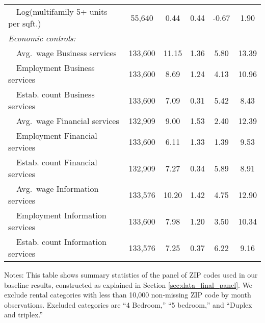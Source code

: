 \begin{table}[hbt!]
\begin{tabular}{@{}lccccc@{}}
        $\quad$Log(multifamily 5+ units per sqft.)    & 55,640  & 0.44  & 0.44  & -0.67  & 1.90  \\[.3em]
        \textit{Economic controls:}                   &       &       &       &       &       \\
        $\quad$Avg.\ wage Business services           & 133,600  & 11.15  & 1.36  & 5.80  & 13.39  \\
        $\quad$Employment Business services           & 133,600  & 8.69  & 1.24  & 4.13  & 10.96  \\
        $\quad$Estab. count Business services         & 133,600  & 7.09  & 0.31  & 5.42  & 8.43  \\
        $\quad$Avg.\ wage Financial services          & 132,909  & 9.00  & 1.53  & 2.40  & 12.39  \\
        $\quad$Employment Financial services          & 133,600  & 6.11  & 1.33  & 1.39  & 9.53  \\
        $\quad$Estab. count Financial services        & 132,909  & 7.27  & 0.34  & 5.89  & 8.91  \\
        $\quad$Avg.\ wage Information services        & 133,576  & 10.20  & 1.42  & 4.75  & 12.90  \\
        $\quad$Employment Information services        & 133,600  & 7.98  & 1.20  & 3.50  & 10.34  \\
        $\quad$Estab. count Information services      & 133,576  & 7.25  & 0.37  & 6.22  & 9.16  \\ \bottomrule
    \end{tabular}

    \begin{minipage}{.95\textwidth} \footnotesize
        \vspace{2mm}
        Notes: This table shows summary statistics of the panel of ZIP codes 
        used in our baseline results, constructed as explained in Section 
        \ref{sec:data_final_panel}.
        We exclude rental categories with less than 10,000 non-missing ZIP code 
        by month observations.
        Excluded categories are ``4 Bedroom,'' ``5 bedroom,'' and 
        ``Duplex and triplex.''
    \end{minipage}
\end{table}
